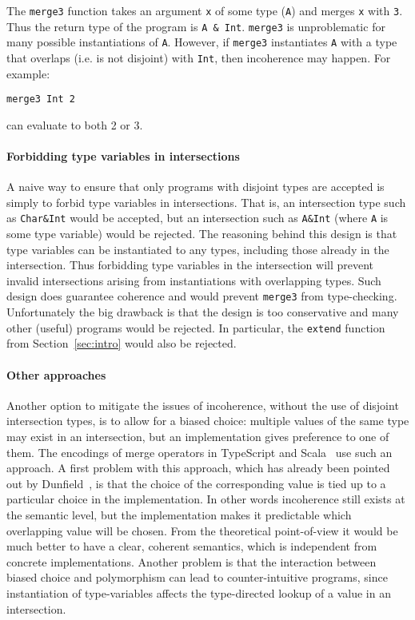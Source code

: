 \noindent The \lstinline{merge3} function takes an argument
\lstinline{x} of some type (\lstinline{A}) and merges \lstinline{x}
with \lstinline{3}. Thus the return type of the program is
\lstinline{A & Int}. \lstinline{merge3} is unproblematic for many
possible instantiations of \lstinline{A}.  However, if
\lstinline{merge3} instantiates \lstinline{A} with a type that
overlaps (i.e. is not disjoint) with \lstinline{Int}, then incoherence may happen.
For example:

\begin{lstlisting}
merge3 Int 2
\end{lstlisting}

\noindent can evaluate to both 2 or 3. 

\paragraph{Forbidding type variables in intersections} 
A naive way to ensure that only programs with disjoint types are accepted is 
simply to forbid type variables in intersections. That is, an
intersection type such as \lstinline{Char&Int} would be accepted, 
but an intersection such as \lstinline{A&Int} (where \lstinline{A} is
some type variable) would be rejected. The reasoning behind this
design is that type variables can be instantiated to any types,
including those already in the intersection. Thus forbidding type
variables in the intersection will prevent invalid intersections
arising from instantiations with overlapping types.
Such design does guarantee coherence and would prevent
\lstinline{merge3} from type-checking. Unfortunately the big drawback
is that the design is too conservative and many other (useful) programs would be 
rejected. In particular, the \lstinline{extend} function from Section~\ref{sec:intro}
would also be rejected. 

\paragraph{Other approaches}
Another option to mitigate the issues of incoherence, without the use of 
disjoint intersection types, is to allow for a biased choice: 
multiple values of the same type may exist in an intersection, but an
implementation gives preference to one of them. The encodings of merge 
operators in TypeScript and Scala~\cite{oliveira2013feature,Rendel14OA} use such an approach.
A first problem with this approach, which has already been pointed out by
Dunfield~\cite{dunfield2014elaborating}, is that the choice of the corresponding value is
tied up to a particular choice in the implementation. In other words
incoherence still exists at the semantic level, but the implementation makes it predictable 
which overlapping value will be chosen. From the
theoretical point-of-view it would be much better to have a clear,
coherent semantics, which is independent from concrete implementations.
Another problem is that the interaction between 
biased choice and polymorphism can lead to counter-intuitive programs, since
instantiation of type-variables affects the type-directed lookup of a
value in an intersection.

